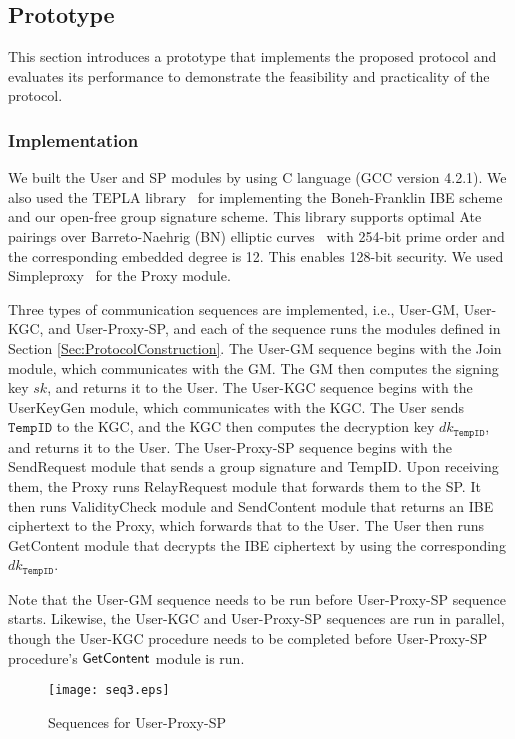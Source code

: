 \documentclass[preprint]{sig-alternate}
\begin{document}
\subsection{Prototype}

This section introduces a prototype that implements the proposed protocol and evaluates its performance to demonstrate the feasibility and practicality of the protocol.

\subsubsection{Implementation}

We built the User and SP modules by using C language (GCC version 4.2.1). 
We also used the TEPLA library~\cite{TEPLA} for implementing the Boneh-Franklin IBE scheme and our open-free group signature scheme. 
This library supports optimal Ate pairings over Barreto-Naehrig (BN) elliptic curves~\cite{[BarretoN05]} with 254-bit prime order and the corresponding embedded degree is 12. 
This enables 128-bit security.
We used Simpleproxy~\cite{Simpleproxy} for the Proxy module.

Three types of communication sequences are implemented, i.e., User-GM, User-KGC, and User-Proxy-SP, and each of the sequence runs the modules defined in Section \ref{Sec:ProtocolConstruction}.
The User-GM sequence begins with the Join module, which communicates with the GM. The GM then computes the signing key $sk$, and returns it to the User.
The User-KGC sequence begins with the UserKeyGen module, which communicates with the KGC. The User sends $\mathtt{TempID}$ to the KGC, and the KGC then computes  the decryption key $dk_{\mathtt{TempID}}$, and returns it to the User.
The User-Proxy-SP sequence begins with the SendRequest module that sends a group signature and TempID.
Upon receiving them, the Proxy runs RelayRequest module that forwards them to the SP.
It then runs ValidityCheck module and SendContent module that returns an IBE ciphertext to the Proxy, which forwards that to the User.
The User then runs GetContent module that decrypts the IBE ciphertext by using the corresponding $dk_{\mathtt{TempID}}$. 

Note that the User-GM sequence needs to be run before User-Proxy-SP sequence starts. Likewise, the User-KGC and User-Proxy-SP sequences are run in parallel, though the User-KGC procedure needs to be completed before User-Proxy-SP procedure's ${\sf Get Content}$ module is run. 


\begin{figure}[htb]
\centering
\texttt{[image: seq3.eps]}
\caption{Sequences for User-Proxy-SP}\label{seq123}
\end{figure}
\end{document}
